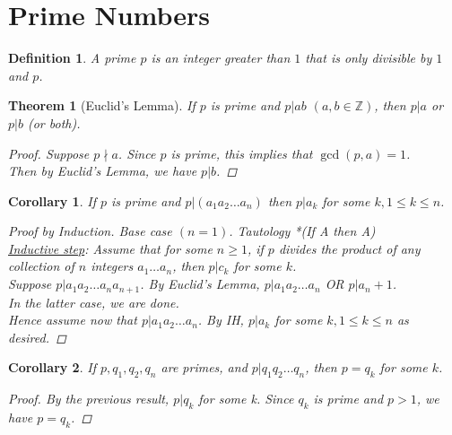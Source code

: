 \documentclass[letterpaper]{article}
\newtheorem{theorem}{Theorem}[section]
\newtheorem{corollary}{Corollary}[theorem]
\newtheorem{definition}{Definition}[section]
\begin{document}
\section{Prime Numbers}
    \begin{definition}
        A prime $p$ is an integer greater than $1$ that is only divisible by $1$ and $p$.
    \end{definition}

    \begin{theorem} [Euclid's Lemma]
        If $p$ is prime and $p|ab$ $(a,b\in\mathbb{Z})$, then $p|a$ or $p|b$ (or both).
        \begin{proof}
            Suppose $p\nmid a$. Since $p$ is prime, this implies that $\gcd(p,a)=1$. \\
            Then by Euclid's Lemma, we have $p|b$.
        \end{proof}
    \end{theorem}

    \begin{corollary}
        If $p$ is prime and $p|(a_1a_2\dots a_n)$ then 
        $p|a_k$ for some $k, 1\leq k\leq n$.
        \begin{proof} [Proof by Induction] 
            Base case $(n=1)$. Tautology *(If A then A) \\
            \underline{Inductive step}: Assume that for some $n\geq 1$, if $p$ divides the product 
            of any collection of $n$ integers $a_1\dots a_n$, then $p|c_k$ for some $k$. \\
            Suppose $p|a_1a_2\dots a_{n}a_{n+1}$.
            By Euclid's Lemma, $p|a_1a_2\dots a_n$ OR $p|a_n+1$. \\
            In the latter case, we are done. \\
            Hence assume now that $p|a_1a_2\dots a_n$. By IH, $p|a_k$ for some 
            $k, 1\leq k\leq n$ as desired.
        \end{proof}
    \end{corollary}

    \begin{corollary}
        If $p,q_1,q_2,q_n$ are primes, and $p|q_1q_2\dots q_n$, then $p=q_k$ for some $k$.
        \begin{proof}
            By the previous result, $p|q_k$ for some k. Since $q_k$ is prime and $p>1$, 
            we have $p=q_k$.
        \end{proof}
    \end{corollary}
\end{document}
